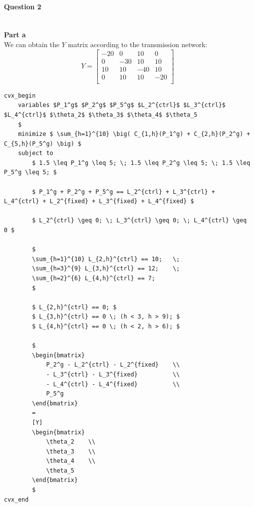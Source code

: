 \documentclass[11pt]{article}
\begin{document}
\paragraph{Question 2} \mbox{} \\
\textbf{Part a} \\
We can obtain the $Y$ matrix according to the transmission network:
$$
Y = 
\begin{bmatrix}
    -20 &  0  &  10 &   0   \\
    0   & -30 &  10 &  10   \\
    10  & 10  & -40 &  10   \\
    0   & 10  & 10  & -20   \\
\end{bmatrix}
$$
\begin{lstlisting}
cvx_begin
    variables $P_1^g$ $P_2^g$ $P_5^g$ $L_2^{ctrl}$ $L_3^{ctrl}$ $L_4^{ctrl}$ $\theta_2$ $\theta_3$ $\theta_4$ $\theta_5
    $
    minimize $ \sum_{h=1}^{10} \big( C_{1,h}(P_1^g) + C_{2,h}(P_2^g) + C_{5,h}(P_5^g) \big) $
    subject to
        $ 1.5 \leq P_1^g \leq 5; \; 1.5 \leq P_2^g \leq 5; \; 1.5 \leq P_5^g \leq 5; $
        
        $ P_1^g + P_2^g + P_5^g == L_2^{ctrl} + L_3^{ctrl} + L_4^{ctrl} + L_2^{fixed} + L_3^{fixed} + L_4^{fixed} $

        $ L_2^{ctrl} \geq 0; \; L_3^{ctrl} \geq 0; \; L_4^{ctrl} \geq 0 $

        $
        \sum_{h=1}^{10} L_{2,h}^{ctrl} == 10;   \;
        \sum_{h=3}^{9} L_{3,h}^{ctrl} == 12;    \;
        \sum_{h=2}^{6} L_{4,h}^{ctrl} == 7;
        $

        $ L_{2,h}^{ctrl} == 0; $
        $ L_{3,h}^{ctrl} == 0 \; (h < 3, h > 9); $
        $ L_{4,h}^{ctrl} == 0 \; (h < 2, h > 6); $
        
        $
        \begin{bmatrix}
            P_2^g - L_2^{ctrl} - L_2^{fixed}    \\
            - L_3^{ctrl} - L_3^{fixed}          \\
            - L_4^{ctrl} - L_4^{fixed}          \\
            P_5^g                       
        \end{bmatrix}
        =
        [Y]
        \begin{bmatrix}
            \theta_2    \\
            \theta_3    \\
            \theta_4    \\
            \theta_5
        \end{bmatrix}
        $
cvx_end
\end{lstlisting}
\end{document}
